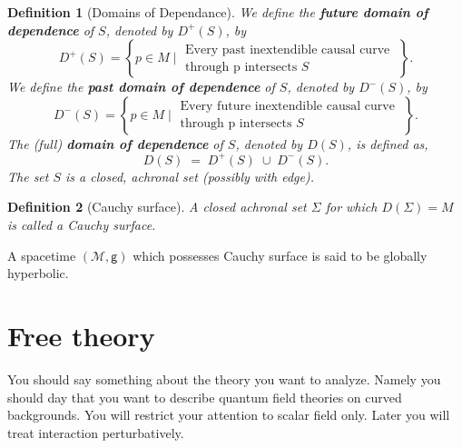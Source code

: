 \documentclass[11pt]{book}
\newcommand{\Mcal}{\mathcal{M}}
\newcommand{\gsf}{\mathsf{g}}
\theoremstyle{break}
\newtheorem{definition}{Definition}
\begin{document}
\begin{definition}[Domains of Dependance]
We define the \textbf{future domain of dependence} of $S$, denoted by $D^{+}(S)$, by
\begin{equation*}
 D^{+}(S) = \left\{ p \in M \; \bigg| \; \begin{array}{l} \text{Every past inextendible causal curve} \\ \text{through p intersects $S$} \end{array} \; \right\}.
\end{equation*}
We define the \textbf{past domain of dependence} of $S$, denoted by $D^{-}(S)$, by
\begin{equation*}
 D^{-}(S) = \left\{ p \in M \; \bigg| \; \begin{array}{l} \text{Every future inextendible causal curve} \\ \text{through p intersects $S$} \end{array} \; \right\}.
\end{equation*}
The (full) \textbf{domain of dependence} of $S$, denoted by $D(S)$, is defined as,
\begin{equation*}
D(S) \; = \; D^{+}(S) \; \cup \; D^{-}(S).
\end{equation*}
The set $S$ is a closed, achronal set (possibly with edge). 
\end{definition}

\begin{definition}[Cauchy surface]
A closed achronal set $\Sigma$ for which $D(\Sigma) = M$ is called a Cauchy surface. 
\end{definition}

A spacetime $(\Mcal,\gsf)$ which possesses Cauchy surface is said to be globally hyperbolic. \par



\chapter{Free theory}


You should say something about the theory you want to analyze.
Namely you should day that you want to describe quantum field theories on curved backgrounds. You will restrict your attention to scalar field only.  Later you will treat interaction perturbatively.
\end{document}
